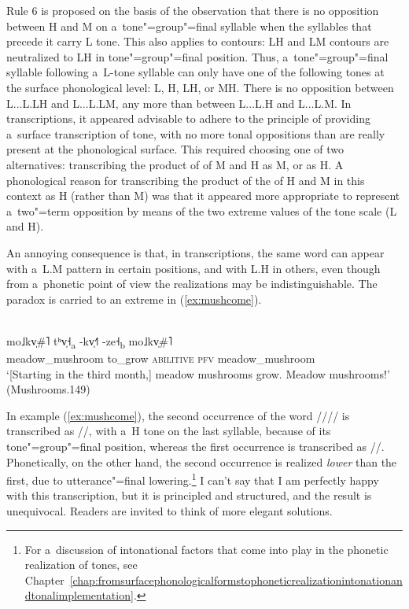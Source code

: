 Rule 6 is proposed on the basis of the observation that there is no opposition between H and M on a~tone"=group"=final syllable when the
syllables that precede it carry L tone. This also applies to contours: LH and LM contours are neutralized to LH in
tone"=group"=final position. Thus, a~tone"=group"=final syllable following a~L-tone syllable can only
have one of the following tones at the surface phonological level: L, H, LH, or MH. There is no opposition between L...L.LH and
L...L.LM, any more than between L...L.H and L...L.M. In transcriptions, it appeared advisable to adhere to the principle of
providing a~surface transcription of tone, with no more tonal oppositions than are really present at
the phonological surface. This required choosing one of two alternatives: transcribing the product of  of M and H as M, or as H. A phonological reason for transcribing the product of the  of H and M in this context as H (rather than M) was that it appeared more appropriate to represent a~two"=term opposition by
means of the two extreme values of the tone scale (L and H). 

An annoying consequence is that, in transcriptions,
the same word can appear with a~L.M pattern in certain positions, and with L.H in others, even though from a~phonetic point of view the realizations may be indistinguishable. The paradox is carried to an extreme in (\ref{ex:mushcome}).

\begin{exe}
	\ex
	\label{ex:mushcome}
	\\
	\gll mo˩kv̩\#˥	tʰv̩˧\textsubscript{a}	-kv̩˧˥	 -ze˧\textsubscript{b}		mo˩kv̩\#˥\\
	meadow\_mushroom	to\_grow	\textsc{abilitive}	\textsc{pfv}	meadow\_mushroom\\
	\glt ‘[Starting in the third month,] meadow mushrooms grow. Meadow mushrooms!’ (Mushrooms.149)
\end{exe}

In example (\ref{ex:mushcome}), the second occurrence of the word //// is transcribed as //, with a~H tone on the last syllable, because of its tone"=group"=final position, whereas the first occurrence is transcribed as //. Phonetically, on the other hand, the second occurrence is realized \textit{lower} than the first, due to utterance"=final lowering.\footnote{For a~discussion of intonational factors that come into play in the phonetic realization of tones, see Chapter~\ref{chap:fromsurfacephonologicalformstophoneticrealizationintonationandtonalimplementation}.} I can't say that I am perfectly happy with this transcription, but it is principled and structured, and the result is unequivocal. Readers are invited to think of more elegant solutions. 

